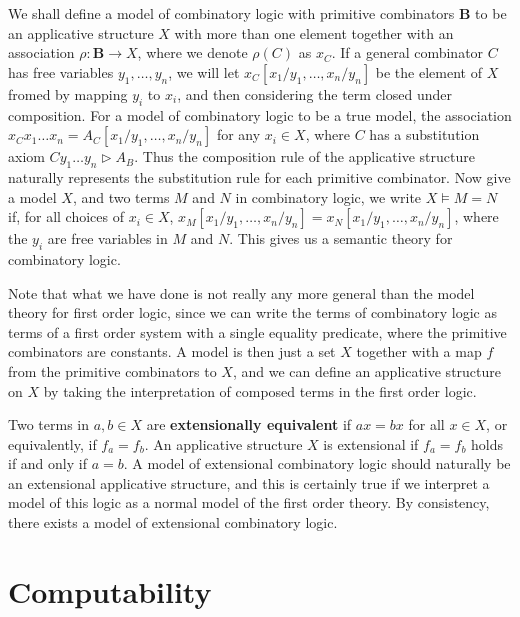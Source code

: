 We shall define a model of combinatory logic with primitive combinators $\mathbf{B}$ to be an applicative structure $X$ with more than one element together with an association $\rho: \mathbf{B} \to X$, where we denote $\rho(C)$ as $x_C$. If a general combinator $C$ has free variables $y_1, \dots, y_n$, we will let $x_C[x_1/y_1, \dots, x_n/y_n]$ be the element of $X$ fromed by mapping $y_i$ to $x_i$, and then considering the term closed under composition. For a model of combinatory logic to be a true model, the association $x_Cx_1 \dots x_n = A_C[x_1/y_1, \dots, x_n/y_n]$ for any $x_i \in X$, where $C$ has a substitution axiom $C y_1 \dots y_n \rhd A_B$. Thus the composition rule of the applicative structure naturally represents the substitution rule for each primitive combinator. Now give a model $X$, and two terms $M$ and $N$ in combinatory logic, we write $X \vDash M = N$ if, for all choices of $x_i \in X$, $x_M[x_1/y_1, \dots, x_n/y_n] = x_N[x_1/y_1, \dots, x_n/y_n]$,  where the $y_i$ are free variables in $M$ and $N$. This gives us a semantic theory for combinatory logic.

Note that what we have done is not really any more general than the model theory for first order logic, since we can write the terms of combinatory logic as terms of a first order system with a single equality predicate, where the primitive combinators are constants. A model is then just a set $X$ together with a map $f$ from the primitive combinators to $X$, and we can define an applicative structure on $X$ by taking the interpretation of composed terms in the first order logic.

Two terms in $a,b \in X$ are {\bf extensionally equivalent} if $ax = bx$ for all $x \in X$, or equivalently, if $f_a = f_b$. An applicative structure $X$ is extensional if $f_a = f_b$ holds if and only if $a = b$. A model of extensional combinatory logic should naturally be an extensional applicative structure, and this is certainly true if we interpret a model of this logic as a normal model of the first order theory. By consistency, there exists a model of extensional combinatory logic.


















\part{Computability}

